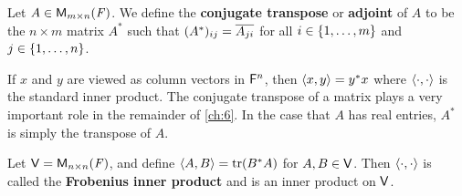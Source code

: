 \begin{defn}\label{6.1.5}
	Let \(A \in \MS\).
	We define the \textbf{conjugate transpose} or \textbf{adjoint} of \(A\) to be the \(n \times m\) matrix \(A^*\) such that \((A^*)_{i j} = \overline{A_{j i}}\) for all \(i \in \left\lbrace1, \dots, m\right\rbrace\) and \(j \in \left\lbrace1, \dots, n\right\rbrace\).
\end{defn}

\begin{note}
	If \(x\) and \(y\) are viewed as column vectors in \(\mathsf{F}^n\), then \(\left\langle x, y\right\rangle = y^* x\) where \(\left\langle\cdot, \cdot\right\rangle\) is the standard inner product.
	The conjugate transpose of a matrix plays a very important role in the remainder of \cref{ch:6}.
	In the case that \(A\) has real entries, \(A^*\) is simply the transpose of \(A\).
\end{note}

\begin{eg}\label{6.1.6}
	Let \(\V = \ms[n][n][\F]\), and define \(\inn{A, B} = \tr(B^* A)\) for \(A, B \in \mathsf{V}\).
	Then \(\left\langle\cdot, \cdot\right\rangle\) is called the \textbf{Frobenius inner product} and is an inner product on \(\mathsf{V}\).
\end{eg}

